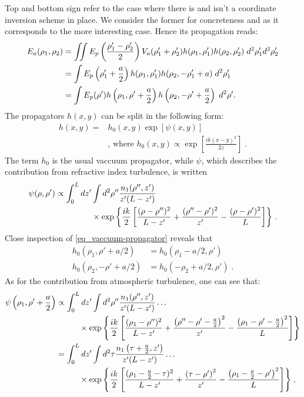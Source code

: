 \documentclass[12pt]{article}
\begin{document}
Top and bottom sign refer to the case where there is and isn't a coordinate inversion scheme in place. We consider the former for concreteness and as it corresponds to the more interesting case. Hence its propagation reads:
\begin{align}
E_a(\rho_1,\rho_2) &= \iint E_p\left(\frac{\rho_1^\prime-\rho_2^\prime}{2}\right) V_a(\rho_1^\prime+\rho_2^\prime) h(\rho_1,\rho_1^\prime) h(\rho_2, \rho_2^\prime) \; d^2\rho_1^\prime d^2\rho_2^\prime \notag \\
&= \int E_p\left(\rho_1^\prime+\frac{a}{2}\right) h(\rho_1,\rho_1^\prime) h(\rho_2, -\rho_1^\prime+a) \; d^2\rho_1^\prime \,  \notag \\
&= \int E_p(\rho^\prime)h\left(\rho_1, \rho^\prime+\frac{a}{2}\right) h\left(\rho_2, -\rho^\prime+\frac{a}{2}\right) \;  d^2\rho^\prime.
\end{align}
The propagators $h(x,y)$ can be split in the following form:
\begin{align}
h(x,y) = &h_0(x,y)\exp{\left[ \psi(x,y) \right]} \\
& \mbox{, where } h_0(x,y) \propto \exp{\left[\frac{ik(x-y)^2}{2z}\right]} \label{eq_vaccuum-propagator}\; .
\end{align}
The term $h_0$ is the usual vaccuum propagator, while $\psi$, which describes the contribution from refractive index turbulence, is written
\begin{align}
\psi(\rho,\rho^\prime) \propto \int_0^L dz^\prime &\int d^2\rho'' \frac{n_1(\rho'',z')}{z'(L-z')} \notag \\
& \times \exp{ \left\{ \frac{ik}{2} \left[ \frac{(\rho-\rho'')^2}{L-z'} + \frac{(\rho''-\rho')^2}{z'} - \frac{(\rho-\rho')^2}{L}\right] \right\}} \; .
\end{align}
Close inspection of \eqref{eq_vaccuum-propagator} reveals that
\begin{align}
h_0(\rho_1,\rho'+a/2) & = h_0(\rho_1-a/2,\rho') \\
h_0(\rho_2,-\rho'+a/2)& = h_0(-\rho_2+a/2,\rho') \; .
\end{align}
As for the contribution from atmospheric turbulence, one can see that:
\begin{align}
\psi\left(\rho_1,\rho^\prime+\frac{a}{2}\right) &\propto \int_0^L dz^\prime \int d^2 \rho^{\prime\prime} \frac{n_1(\rho^{\prime\prime},z^\prime)}{z^\prime (L-z^\prime)} \ldots \notag \\
& \hspace{1cm} \times \exp{\left\{\frac{ik}{2}\left[ \frac{(\rho_1-\rho^{\prime\prime})^2}{L-z^\prime} + \frac{\left(\rho^{\prime\prime}-\rho^\prime-\frac{a}{2}\right)^2}{z^\prime} - \frac{\left(\rho_1 -\rho^\prime -\frac{a}{2}\right)^2}{L}\right]\right\}} \notag \\
&=\int_0^L dz^\prime \int d^2 \tau \frac{n_1\left(\tau+\frac{a}{2},z^\prime\right)}{z^\prime (L-z^\prime)} \ldots \notag \\
& \hspace{1cm} \times \exp{\left\{\frac{ik}{2}\left[ \frac{(\rho_1- \frac{a}{2}-\tau)^2}{L-z^\prime} + \frac{\left(\tau-\rho^\prime\right)^2}{z^\prime} - \frac{\left(\rho_1 -\frac{a}{2} -\rho^\prime\right)^2}{L}\right]\right\}} \; , 
\end{align}
\end{document}
